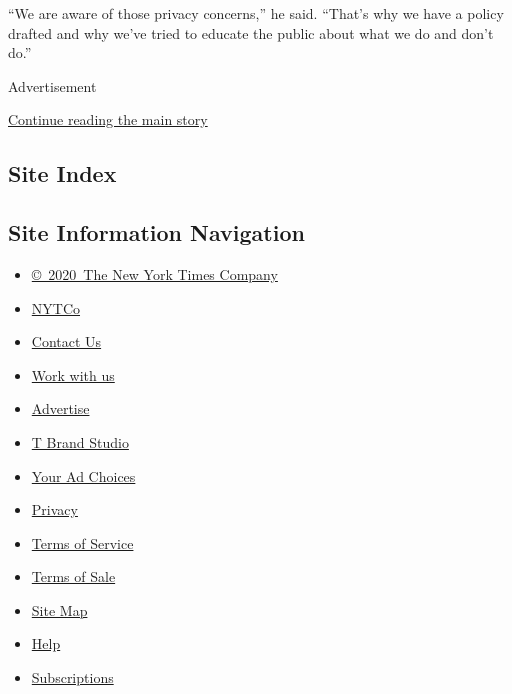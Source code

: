 ``We are aware of those privacy concerns,'' he said. ``That's why we
have a policy drafted and why we've tried to educate the public about
what we do and don't do.''

Advertisement

\protect\hyperlink{after-bottom}{Continue reading the main story}

\hypertarget{site-index}{%
\subsection{Site Index}\label{site-index}}

\hypertarget{site-information-navigation}{%
\subsection{Site Information
Navigation}\label{site-information-navigation}}

\begin{itemize}
\tightlist
\item
  \href{https://help.nytimes3xbfgragh.onion/hc/en-us/articles/115014792127-Copyright-notice}{©~2020~The
  New York Times Company}
\end{itemize}

\begin{itemize}
\tightlist
\item
  \href{https://www.nytco.com/}{NYTCo}
\item
  \href{https://help.nytimes3xbfgragh.onion/hc/en-us/articles/115015385887-Contact-Us}{Contact
  Us}
\item
  \href{https://www.nytco.com/careers/}{Work with us}
\item
  \href{https://nytmediakit.com/}{Advertise}
\item
  \href{http://www.tbrandstudio.com/}{T Brand Studio}
\item
  \href{https://www.nytimes3xbfgragh.onion/privacy/cookie-policy\#how-do-i-manage-trackers}{Your
  Ad Choices}
\item
  \href{https://www.nytimes3xbfgragh.onion/privacy}{Privacy}
\item
  \href{https://help.nytimes3xbfgragh.onion/hc/en-us/articles/115014893428-Terms-of-service}{Terms
  of Service}
\item
  \href{https://help.nytimes3xbfgragh.onion/hc/en-us/articles/115014893968-Terms-of-sale}{Terms
  of Sale}
\item
  \href{https://spiderbites.nytimes3xbfgragh.onion}{Site Map}
\item
  \href{https://help.nytimes3xbfgragh.onion/hc/en-us}{Help}
\item
  \href{https://www.nytimes3xbfgragh.onion/subscription?campaignId=37WXW}{Subscriptions}
\end{itemize}
